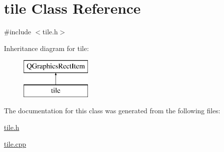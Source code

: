 \hypertarget{classtile}{\section{tile Class Reference}
\label{classtile}
}


{\ttfamily \#include $<$tile.\-h$>$}

Inheritance diagram for tile\-:\begin{figure}[H]
\begin{center}
\leavevmode
\includegraphics[height=2.000000cm]{classtile}
\end{center}
\end{figure}


The documentation for this class was generated from the following files\-:\begin{DoxyCompactItemize}
\item 
\hyperlink{tile_8h}{tile.\-h}\item 
\hyperlink{tile_8cpp}{tile.\-cpp}\end{DoxyCompactItemize}
